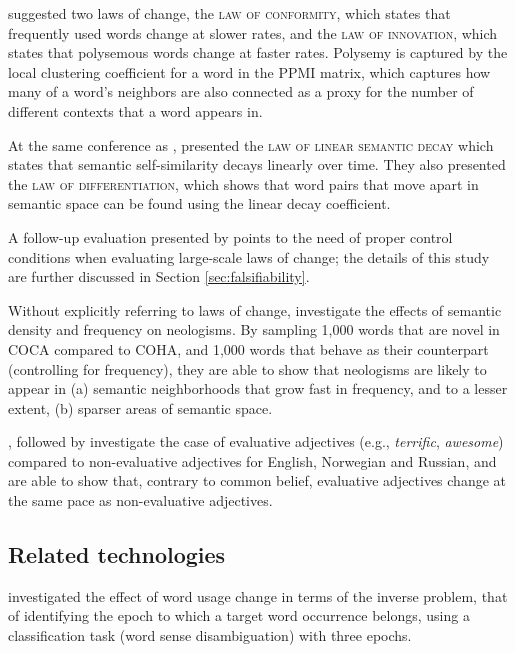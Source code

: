 \documentclass[output=paper]{langsci/langscibook}
\begin{document}
\citet{hamilton-etal-2016-diachronic} suggested two laws of change, the \textsc{law of conformity}, which states that frequently used words change at slower rates, and the \textsc{law of innovation}, which  states that polysemous words change at faster rates. Polysemy is captured by the local clustering coefficient for a word in the PPMI matrix, which captures how many of a word's neighbors are also connected as a proxy for the number of different contexts that a word appears in. 

At the same conference as \citet{hamilton-etal-2016-diachronic}, \citet{eger-mehler-2016-linearity} presented the \textsc{law of linear semantic decay} which states that semantic self-similarity decays linearly over time. They also presented the \textsc{law of differentiation}, which shows that word pairs that move apart in semantic space can be found using the linear decay coefficient. 

A follow-up evaluation presented by \citet{dubossarsky-etal-2017-outta} points to the need of proper control conditions when evaluating large-scale laws of change; the details of this study are further discussed in Section \ref{sec:falsifiability}.

Without explicitly referring to laws of change, \citet{ryskina2020new} investigate the effects of semantic density and frequency on neologisms. By sampling 1,000 words that are novel in COCA compared to COHA, and 1,000 words that behave as their counterpart (controlling for frequency), they are able to show that neologisms are likely to appear in (a) semantic neighborhoods that grow fast in frequency, and to a lesser extent, (b) sparser areas of semantic space. 

\citet{rodina2019measuring}, followed by \citet{kutuzov2020-phd} investigate the case of evaluative adjectives (e.g., \emph{terrific}, \emph{awesome}) compared to non-evaluative adjectives for English, Norwegian and Russian, and are able to show that, contrary to common belief, evaluative adjectives change at the same pace as non-evaluative adjectives.



\subsection{Related technologies}\label{subs:relatedtec}
 
 
 \citet{mihalcea_wordepochdis} investigated the effect of word usage change in terms of the inverse problem, that of identifying the epoch to which a target word occurrence belongs, using a classification task (word sense disambiguation) with three epochs. 
 
\end{document}
